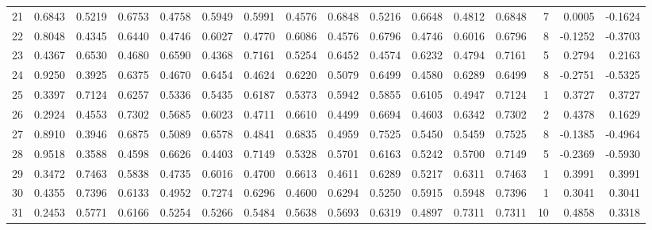 \begin{tabular}{lrrrrrrrrrrrrrrr}
21  &      0.6843 &  0.5219 &  0.6753 &  0.4758 &  0.5949 &  0.5991 &  0.4576 &  0.6848 &  0.5216 &  0.6648 &   0.4812 &     0.6848 &      7 &                    0.0005 &                    -0.1624 \\
22  &      0.8048 &  0.4345 &  0.6440 &  0.4746 &  0.6027 &  0.4770 &  0.6086 &  0.4576 &  0.6796 &  0.4746 &   0.6016 &     0.6796 &      8 &                   -0.1252 &                    -0.3703 \\
23  &      0.4367 &  0.6530 &  0.4680 &  0.6590 &  0.4368 &  0.7161 &  0.5254 &  0.6452 &  0.4574 &  0.6232 &   0.4794 &     0.7161 &      5 &                    0.2794 &                     0.2163 \\
24  &      0.9250 &  0.3925 &  0.6375 &  0.4670 &  0.6454 &  0.4624 &  0.6220 &  0.5079 &  0.6499 &  0.4580 &   0.6289 &     0.6499 &      8 &                   -0.2751 &                    -0.5325 \\
25  &      0.3397 &  0.7124 &  0.6257 &  0.5336 &  0.5435 &  0.6187 &  0.5373 &  0.5942 &  0.5855 &  0.6105 &   0.4947 &     0.7124 &      1 &                    0.3727 &                     0.3727 \\
26  &      0.2924 &  0.4553 &  0.7302 &  0.5685 &  0.6023 &  0.4711 &  0.6610 &  0.4499 &  0.6694 &  0.4603 &   0.6342 &     0.7302 &      2 &                    0.4378 &                     0.1629 \\
27  &      0.8910 &  0.3946 &  0.6875 &  0.5089 &  0.6578 &  0.4841 &  0.6835 &  0.4959 &  0.7525 &  0.5450 &   0.5459 &     0.7525 &      8 &                   -0.1385 &                    -0.4964 \\
28  &      0.9518 &  0.3588 &  0.4598 &  0.6626 &  0.4403 &  0.7149 &  0.5328 &  0.5701 &  0.6163 &  0.5242 &   0.5700 &     0.7149 &      5 &                   -0.2369 &                    -0.5930 \\
29  &      0.3472 &  0.7463 &  0.5838 &  0.4735 &  0.6016 &  0.4700 &  0.6613 &  0.4611 &  0.6289 &  0.5217 &   0.6311 &     0.7463 &      1 &                    0.3991 &                     0.3991 \\
30  &      0.4355 &  0.7396 &  0.6133 &  0.4952 &  0.7274 &  0.6296 &  0.4600 &  0.6294 &  0.5250 &  0.5915 &   0.5948 &     0.7396 &      1 &                    0.3041 &                     0.3041 \\
31  &      0.2453 &  0.5771 &  0.6166 &  0.5254 &  0.5266 &  0.5484 &  0.5638 &  0.5693 &  0.6319 &  0.4897 &   0.7311 &     0.7311 &     10 &                    0.4858 &                     0.3318 \\

\end{tabular}
